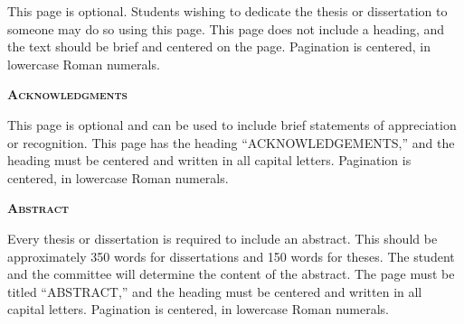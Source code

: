 \documentclass[12pt, oneside]{memoir}
\begin{document}
	\pagestyle{pter}
	\begin{vplace}[0.7]
		\begin{center}
		This page is optional. Students wishing to dedicate the thesis or dissertation to someone may do so using this page. This page does not include a heading, and the text should be brief and centered on the page. Pagination is centered, in lowercase Roman numerals.
		
		\end{center}
	\end{vplace}
	\newpage

	\pagestyle{pter}
	\begin{center}
	\textbf{\Large\scshape Acknowledgments}
	\end{center}
	This page is optional and can be used to include brief statements of appreciation or recognition. This page has the heading “ACKNOWLEDGEMENTS,” and the heading must be centered and written in all capital letters. Pagination is centered, in lowercase Roman numerals.
	
	\newpage

	\pagestyle{pter}
	\begin{center}
	\textbf{\Large\scshape Abstract}
	\end{center}
Every thesis or dissertation is required to include an abstract. This should be approximately 350 words for dissertations and 150 words for theses. The student and the committee will determine the content of the abstract. The page must be titled “ABSTRACT,” and the heading must be centered and written in all capital letters. Pagination is centered, in lowercase Roman numerals.

	
	\newpage
	
	\tableofcontents*
	\clearpage
	
	\listoftables
    \clearpage

	\listoffigures
	\clearpage
	
	\mainmatter
	
	\clearpage
	
	\clearpage
	
	\clearpage
	
	\clearpage
	
	\clearpage
	
	\SingleSpacing
	
	\clearpage
	\DoubleSpacing
	\appendixpage
	
	\clearpage
	
%	
%	
	
\end{document}
